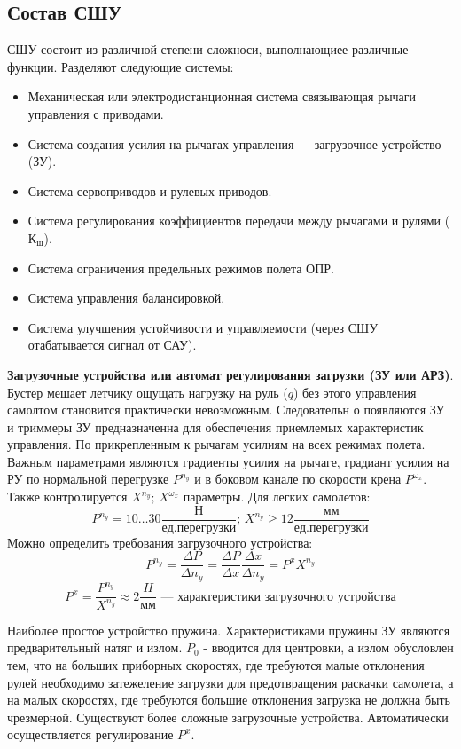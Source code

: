 \documentclass{article}
\begin{document}
\subsection{Состав СШУ}
СШУ состоит из различной степени сложноси, выполнающиее различные функции. Разделяют следующие системы:
\begin{itemize}
\item Механическая или электродистанционная система связывающая рычаги управления с приводами. 
\item Система создания усилия на рычагах управления --- загрузочное устройство (ЗУ).
\item Система сервоприводов и рулевых приводов.
\item Система регулирования коэффициентов передачи между рычагами и рулями ($К_ш$).
\item Система ограничения предельных режимов полета ОПР. 
\item Система управления балансировкой. 
\item Система улучшения устойчивости и управляемости (через СШУ отабатывается сигнал от САУ). 
\end{itemize}
\textbf{Загрузочные устройства или автомат регулирования загрузки (ЗУ или АРЗ)}. Бустер мешает летчику ощущать нагрузку на руль ($q$) без этого управления самолтом становится практически невозможным. Следовательн  о появляются ЗУ и триммеры 
ЗУ предназначенна для обеспечения приемлемых характеристик управления. По прикрепленным к рычагам усилиям на всех режимах полета. Важным параметрами являются градиенты усилия на рычаге, градиант усилия на РУ по нормальной перегрузке $P^{n_y}$ и в боковом канале по скорости крена $P^{\omega_x}$. Также контролируется $X^{n_y}; \, X^{\omega_x}$ параметры. Для легких самолетов:
\[
P^{n_y} =10 \dots 30 \frac{Н}{ед. перегрузки}; \, X^{n_y} \ge 12 \frac{мм}{ед. перегрузки} 
\]
Можно определить требования загрузочного устройства:
\[
P^{n_y} = \frac{\Delta P}{\Delta n_y} = \frac{\Delta P}{\Delta x} \frac{\Delta x}{\Delta n_y} = P^{x} X^{n_y}
\]
\[
P^{x} = \frac{P^{n_y}}{X^{n_y}} \approx 2 \frac{H}{мм} \text{ --- характеристики загрузочного устройства}
\]

Наиболее простое устройство пружина.
Характеристиками пружины ЗУ являются предварительный натяг и излом. $P_0$ - вводится для центровки, а излом обусловлен тем, что на больших приборных скоростях, где требуются малые отклонения рулей необходимо затежеление загрузки для предотвращения раскачки самолета, а на малых скоростях, где требуются большие отклонения загрузка не должна быть чрезмерной. Существуют более сложные загрузочные устройства. Автоматически осуществляется регулирование $P^{x}$. 
\end{document}
